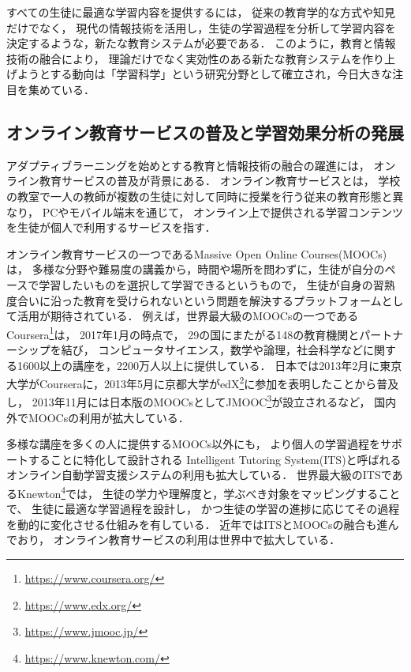 すべての生徒に最適な学習内容を提供するには，
従来の教育学的な方式や知見だけでなく，
現代の情報技術を活用し，生徒の学習過程を分析して学習内容を決定するような，新たな教育システムが必要である．
このように，教育と情報技術の融合により，
理論だけでなく実効性のある新たな教育システムを作り上げようとする動向は「学習科学」という研究分野として確立され，今日大きな注目を集めている\cite{白水始2014学習科学の新展開}．


\subsection{オンライン教育サービスの普及と学習効果分析の発展}
アダプティブラーニングを始めとする教育と情報技術の融合の躍進には，
オンライン教育サービスの普及が背景にある．
オンライン教育サービスとは，
学校の教室で一人の教師が複数の生徒に対して同時に授業を行う従来の教育形態と異なり，
PCやモバイル端末を通じて，
オンライン上で提供される学習コンテンツを生徒が個人で利用するサービスを指す．

オンライン教育サービスの一つであるMassive Open Online Courses(MOOCs)\cite{mcauley2010mooc, pappano2012year,siemens2013massive}は，
多様な分野や難易度の講義から，時間や場所を問わずに，生徒が自分のペースで学習したいものを選択して学習できるというもので，
生徒が自身の習熟度合いに沿った教育を受けられないという問題を解決するプラットフォームとして活用が期待されている．
例えば，世界最大級のMOOCsの一つであるCoursera\footnote{\url{https://www.coursera.org/}}は，
2017年1月の時点で，
29の国にまたがる148の教育機関とパートナーシップを結び，
コンピュータサイエンス，数学や論理，社会科学などに関する1600以上の講座を，2200万人以上に提供している．
日本では2013年2月に東京大学がCourseraに，2013年5月に京都大学がedX\footnote{\url{https://www.edx.org/}}に参加を表明したことから普及し，
2013年11月には日本版のMOOCsとしてJMOOC\footnote{\url{https://www.jmooc.jp/}}が設立されるなど，
国内外でMOOCsの利用が拡大している．

多様な講座を多くの人に提供するMOOCs以外にも，
より個人の学習過程をサポートすることに特化して設計される
Intelligent Tutoring System(ITS)と呼ばれるオンライン自動学習支援システムの利用も拡大している．
世界最大級のITSであるKnewton\footnote{\url{https://www.knewton.com/}}では，
生徒の学力や理解度と，学ぶべき対象をマッピングすることで、
生徒に最適な学習過程を設計し，
かつ生徒の学習の進捗に応じてその過程を動的に変化させる仕組みを有している\cite{upbin2012knewton}．
近年ではITSとMOOCsの融合も進んでおり\cite{aleven2015beginning}，
オンライン教育サービスの利用は世界中で拡大している．

